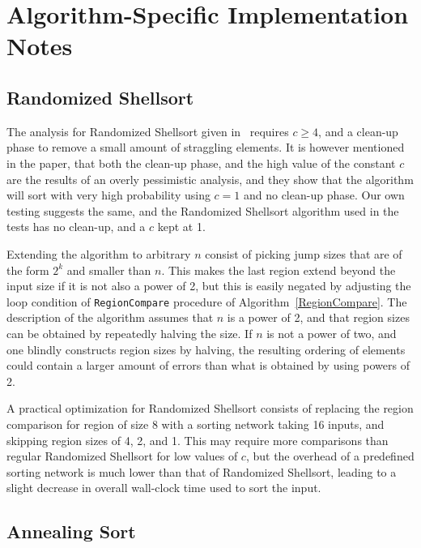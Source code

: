 \section{Algorithm-Specific Implementation Notes} \FloatBarrier
\label{sec:specificimpl}

\subsection{Randomized Shellsort}

The analysis for Randomized Shellsort given in~ requires $c \geq 4$, and a clean-up phase to remove a small amount of straggling elements.
It is however mentioned in the paper, that both the clean-up phase, and the high value of the constant $c$ are the results of an overly pessimistic analysis, and they show that the algorithm will sort with very high probability using $c = 1$ and no clean-up phase. Our own testing suggests the same, and the Randomized Shellsort algorithm used in the tests has no clean-up, and a $c$ kept at 1.

Extending the algorithm to arbitrary $n$ consist of picking jump sizes that are of the form $2^k$ and smaller than $n$. This makes the last region extend beyond the input size if it is not also a power of 2, but this is easily negated by adjusting the loop condition of \texttt{RegionCompare} procedure of Algorithm~\ref{RegionCompare}. 
The description of the algorithm assumes that $n$ is a power of 2, and that region sizes can be obtained by repeatedly halving the size. If $n$ is not a power of two, and one blindly constructs region sizes by halving, the resulting ordering of elements could contain a larger amount of errors than what is obtained by using powers of 2.

A practical optimization for Randomized Shellsort consists of replacing the region comparison for region of size 8 with a sorting network taking 16 inputs, and skipping region sizes of 4, 2, and 1. This may require more comparisons than regular Randomized Shellsort for low values of $c$, but the overhead of a predefined sorting network is much lower than that of Randomized Shellsort, leading to a slight decrease in overall wall-clock time used to sort the input.

\subsection{Annealing Sort}
\label{sec:AnnealingSortImplementation}

